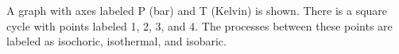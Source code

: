 A graph with axes labeled P (bar) and T (Kelvin) is shown. There is a square cycle with points labeled 1, 2, 3, and 4. The processes between these points are labeled as isochoric, isothermal, and isobaric.